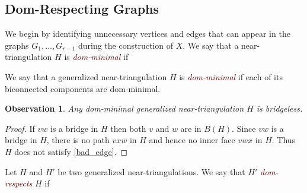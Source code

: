 \documentclass[12pt]{article}
\newtheorem{obs}{Observation}
\newcommand{\defin}[1]{\emph{\textcolor{Maroon}{#1}}}
\theoremstyle{definition}
\begin{document}
\subsection{Dom-Respecting Graphs}

We begin by identifying unnecessary vertices and edges that can appear in the graphs $G_1,\ldots,G_{r-1}$ during the construction of $X$.   We say that a near-triangulation $H$ is \defin{dom-minimal} if
We say that a generalized near-triangulation $H$ is \defin{dom-minimal} if each of its biconnected components are dom-minimal.

\begin{obs}\label{bridgeless}
    Any dom-minimal generalized near-triangulation $H$ is bridgeless.
\end{obs}

\begin{proof}
   If $vw$ is a bridge in $H$ then both $v$ and $w$ are in $B(H)$.  Since $vw$ is a bridge in $H$, there is no path $vxw$ in $H$ and hence no inner face $vwx$ in $H$. Thus $H$ does not satisfy \cref{bad_edge}.
\end{proof}

Let $H$ and $H'$ be two generalized near-triangulations.  We say that $H'$ \defin{dom-respects} $H$ if
\end{document}
